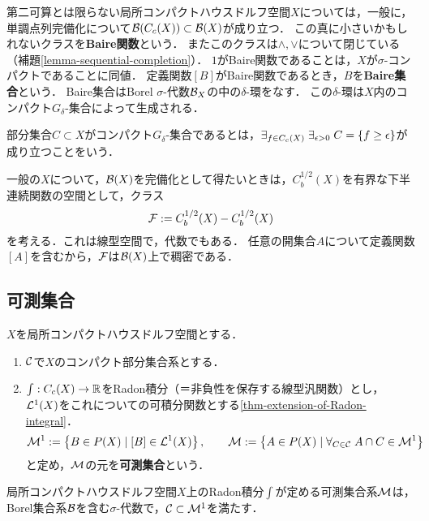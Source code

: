 \documentclass[uplatex,dvipdfmx]{jsreport}
\begin{document}
\begin{remark}
    第二可算とは限らない局所コンパクトハウスドルフ空間$X$については，一般に，単調点列完備化について$\mathcal{B}(C_c(X))\subset\mathcal{B}(X)$が成り立つ．
    この真に小さいかもしれないクラスを\textbf{Baire関数}という．
    またこのクラスは$\land,\lor$について閉じている（補題\ref{lemma-sequential-completion}）．
    $1$がBaire関数であることは，$X$が$\sigma$-コンパクトであることに同値．
    定義関数$[B]$がBaire関数であるとき，$B$を\textbf{Baire集合}という．
    Baire集合はBorel $\sigma$-代数$\mathcal{B}_X$の中の$\delta$-環をなす．
    この$\delta$-環は$X$内のコンパクト$G_\delta$-集合によって生成される．
\end{remark}

\begin{definition}
    部分集合$C\subset X$がコンパクト$G_\delta$-集合であるとは，$\exists_{f\in C_c(X)}\;\exists_{\epsilon>0}\;C=\{f\ge \epsilon\}$が成り立つことをいう．
\end{definition}

\begin{remark}[Borel関数の空間の得方]
    一般の$X$について，$\mathcal{B}(X)$を完備化として得たいときは，$C^{1/2}_b(X)$を有界な下半連続関数の空間として，クラス
    \[\mathcal{F}:=C^{1/2}_b(X)-C^{1/2}_b(X)\]
    を考える．これは線型空間で，代数でもある．
    任意の開集合$A$について定義関数$[A]$を含むから，$\mathcal{F}$は$\mathcal{B}(X)$上で稠密である．
\end{remark}

\subsection{可測集合}

\begin{definition}\label{def-measurable-sets}
    $X$を局所コンパクトハウスドルフ空間とする．
    \begin{enumerate}
        \item $\mathcal{C}$で$X$のコンパクト部分集合系とする．
        \item $\int:C_c(X)\to\mathbb{R}$をRadon積分（＝非負性を保存する線型汎関数）とし，$\mathcal{L}^1(X)$をこれについての可積分関数とする\ref{thm-extension-of-Radon-integral}．
        \[\mathcal{M}^1:=\left\{B\in P(X)\mid [B]\in\mathcal{L}^1(X)\right\},\qquad\mathcal{M}:=\left\{A\in P(X)\mid\forall_{C\in\mathcal{C}}\;A\cap C\in\mathcal{M}^1\right\}\]
        と定め，$\mathcal{M}$の元を\textbf{可測集合}という．
    \end{enumerate}
\end{definition}

\begin{proposition}
    局所コンパクトハウスドルフ空間$X$上のRadon積分$\int$が定める可測集合系$\mathcal{M}$は，Borel集合系$\mathcal{B}$を含む$\sigma$-代数で，$\mathcal{C}\subset\mathcal{M}^1$を満たす．
\end{proposition}
\end{document}

